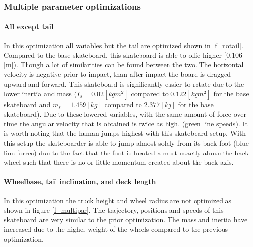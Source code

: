 \documentclass[default,iicol]{sn-jnl}
\begin{document}
{\subsubsection{Multiple parameter optimizations}
\paragraph{All except tail}
\noindent In this optimization all variables but the tail are optimized shown in \ref{f_notail}. Compared to the base skateboard, this skateboard is able to ollie higher (0.106 [m]). Though a lot of similarities can be found between the two. The horizontal velocity is negative prior to impact, than after impact the board is dragged upward and forward. This skateboard is significantly easier to rotate due to the lower inertia and mass ($I_s = 0.02 [kg m^2]$ compared to $0.122 [kg m^2]$ for the base skateboard and $m_s = 1.459 [kg]$ compared to $2.377 [kg]$ for the base skateboard). Due to these lowered variables, with the same amount of force over time the angular velocity that is obtained is twice as high. (green line speeds). It is worth noting that the human jumps highest with this skateboard setup. 
With this setup the skateboarder is able to jump almost solely from its back foot (blue line forces) due to the fact that the foot is located almost exactly above the back wheel such that there is no or little momentum created about the back axis. 

\paragraph{Wheelbase, tail inclination, and deck length}
\noindent In this optimization the truck height and wheel radius are not optimized as shown in figure \ref{f_multipar}. The trajectory, positions and speeds of this skateboard are very similar to the prior optimization. The mass and inertia have increased due to the higher weight of the wheels compared to the previous optimization.

}
\end{document}
